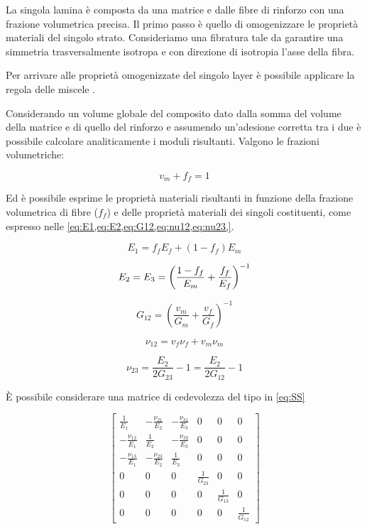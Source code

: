 \documentclass[a4paper,num-refs]{oup-contemporary}
\begin{document}
La singola lamina è composta da una matrice e dalle fibre di rinforzo con una frazione volumetrica precisa. Il primo passo è quello di omogenizzare le proprietà materiali del singolo strato. Consideriamo una fibratura tale da garantire una simmetria trasversalmente isotropa e con direzione di isotropia l'asse della fibra. 

Per arrivare alle proprietà omogenizzate del singolo layer è possibile applicare la regola delle miscele \citep{Kollar:1}.

Considerando un volume globale del composito dato dalla somma del volume della matrice e di quello del rinforzo e assumendo un'adesione corretta tra i due è possibile calcolare analiticamente i moduli risultanti. Valgono le frazioni volumetriche:

\begin{equation}
v_m+f_f=1   
\end{equation}

Ed è possibile esprime le proprietà materiali risultanti in funzione della frazione volumetrica di fibre ($f_f$) e delle proprietà materiali dei singoli costituenti, come espresso nelle \cref{eq:E1,eq:E2,eq:G12,eq:nu12,eq:nu23,}. 

\begin{equation}
E_1=f_f E_f+\left(1-f_f\right)E_m
\label{eq:E1}
\end{equation}

\begin{equation}
{E_2}=E_3=\left({1-f_f\over E_m}+{f_f\over E_f}\right)^{-1}
\label{eq:E2}
\end{equation}

\begin{equation}
G_{12}=\left(\frac{v_{m}}{G_{m}}+\frac{v_{f}}{G_{f}}\right)^{-1}
\label{eq:G12}
\end{equation}

\begin{equation}
\nu_{12}=v_{f} \nu_{f}+v_{m} \nu_{m}
	\label{eq:nu12}
\end{equation}

\begin{equation}
\nu_{23}=\frac{E_{2}}{2 G_{23}}-1=\frac{E_{2}}{2 G_{12}}-1
	\label{eq:nu23}
\end{equation}

È possibile considerare una matrice di cedevolezza del tipo in \cref{eq:SS}

\begin{equation}
\begin{bmatrix}
	\frac{1}{E_{1}} & -\frac{\nu_{21}}{E_{2}} & -\frac{\nu_{31}}{E_{3}} & 0 & 0 & 0 \\
	-\frac{\nu_{12}}{E_{1}} & \frac{1}{E_{2}} & -\frac{\nu_{32}}{E_{3}} & 0 & 0 & 0 \\
	-\frac{\nu_{13}}{E_{1}} & -\frac{\nu_{23}}{E_{2}} & \frac{1}{E_{3}} & 0 & 0 & 0 \\
	0 & 0 & 0 & \frac{1}{G_{23}} & 0 & 0 \\
	0 & 0 & 0 & 0 & \frac{1}{G_{13}} & 0 \\
	0 & 0 & 0 & 0 & 0 & \frac{1}{G_{12}}
\end{bmatrix}
\label{eq:SS}
\end{equation}
\end{document}
